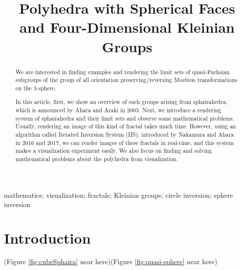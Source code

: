 \documentclass[suppldata, dvipdfmx]{interact}
\date{\empty}
\theoremstyle{plain}%
\theoremstyle{definition}
\theoremstyle{remark}
\theoremstyle{problemstyle}
\begin{document}

\title{Polyhedra with Spherical Faces and Four-Dimensional Kleinian Groups}

\author{
}

\maketitle

\begin{abstract}
We are interested in finding examples and rendering the limit sets of
quasi-Fuchsian subgroups of the group of all orientation
preserving/reversing Moebius transformations on the 3-sphere.

In this article, first, we show an overview of such groups arising from
sphairahedra, which is announced by Ahara and Araki in 2003.
Next, we introduce a rendering system of sphairahedra and their limit
sets and observe some mathematical problems. 
Usually, rendering an image of this kind of fractal takes much time.
However, using an algorithm called Iterated Inversion System (IIS),
introduced by Nakamura and Ahara in 2016 and 2017,
we can render images of these fractals in real-time, and this system
makes a visualization experiment easily. We also focus on finding and
solving mathematical problems about the polyhedra from visualization.

\end{abstract}

\begin{keywords}
mathematics; visualization; fractals; Kleinian groups; circle inversion;
 sphere inversion
\end{keywords}


\section{Introduction}

(Figure \ref{fig:cubeSphaira} near here)(Figure
\ref{fig:quasi-sphere}
near here)
\end{document}
